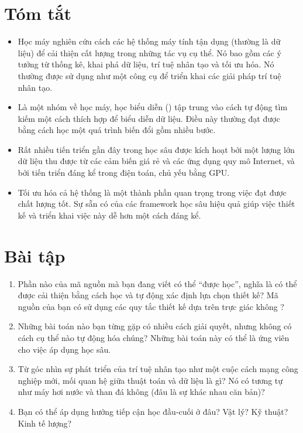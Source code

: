 \documentclass[letterpaper,11pt,english]{sphinxmanual}
\begin{document}
\section{Tóm tắt}
\label{\detokenize{chapter_introduction/index_vn:tom-tat}}

\begin{itemize}
\item {} 
Học máy nghiên cứu cách các hệ thống máy tính tận dụng 
(thường là dữ liệu) để cải thiện cất lượng trong những tác vụ cụ thể.
Nó bao gồm các ý tưởng từ thống kê, khai phá dữ liệu, trí tuệ nhân
tạo và tối ưu hóa. Nó thường được sử dụng như một công cụ để triển
khai các giải pháp trí tuệ nhân tạo.

\item {} 
Là một nhóm về học máy, học biểu diễn ()
tập trung vào cách tự động tìm kiếm một cách thích hợp để biểu diễn
dữ liệu. Điều này thường đạt được bằng cách học một quá trình biến
đổi gồm nhiều bước.

\item {} 
Rất nhiều tiến triển gần đây trong học sâu được kích hoạt bởi một
lượng lớn dữ liệu thu được từ các cảm biến giá rẻ và các ứng dụng quy
mô Internet, và bởi tiến triển đáng kể trong điện toán, chủ yếu bằng
GPU.

\item {} 
Tối ưu hóa cả hệ thống là một thành phần quan trọng trong việc đạt
được chất lượng tốt. Sự sẵn có của các framework học sâu hiệu quả
giúp việc thiết kế và triển khai việc này dễ hơn một cách đáng kể.

\end{itemize}




\section{Bài tập}
\label{\detokenize{chapter_introduction/index_vn:bai-tap}}

\begin{enumerate}
%
\item {} 
Phần nào của mã nguồn mà bạn đang viết có thể “được học”, nghĩa là có
thể được cải thiện bằng cách học và tự động xác định lựa chọn thiết
kế? Mã nguồn của bạn có sử dụng các quy tắc thiết kế dựa trên trực
giác không ?

\item {} 
Những bài toán nào bạn từng gặp có nhiều cách giải quyết, nhưng không
có cách cụ thể nào tự động hóa chúng? Những bài toán này có thể là
ứng viên cho việc áp dụng học sâu.

\item {} 
Từ góc nhìn sự phát triển của trí tuệ nhân tạo như một cuộc cách mạng
công nghiệp mới, mối quan hệ giữa thuật toán và dữ liệu là gì? Nó có
tương tự như máy hơi nước và than đá không (đâu là sự khác nhau căn
bản)?

\item {} 
Bạn có thể áp dụng hướng tiếp cận học đầu-cuối ở đâu? Vật lý? Kỹ
thuật? Kinh tế lượng?

\end{enumerate}
\end{document}
